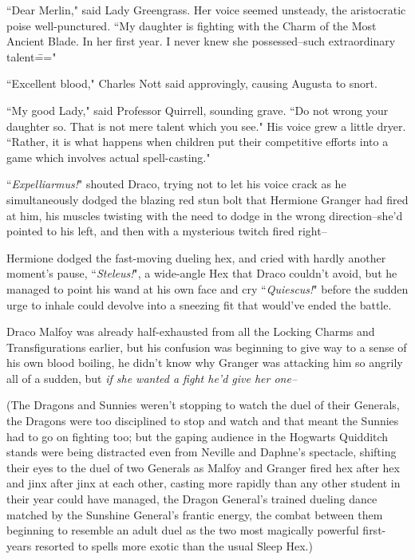 \later

``Dear Merlin," said Lady Greengrass. Her voice seemed unsteady, the aristocratic poise well-punctured. ``My daughter is fighting with the Charm of the Most Ancient Blade. In her first year. I never knew she possessed\---such extraordinary talent\==="

``Excellent blood," Charles Nott said approvingly, causing Augusta to snort.

``My good Lady," said Professor Quirrell, sounding grave. ``Do not wrong your daughter so. That is not mere talent which you see." His voice grew a little dryer. ``Rather, it is what happens when children put their competitive efforts into a game which involves actual spell-casting."

\later

``\emph{Expelliarmus!}" shouted Draco, trying not to let his voice crack as he simultaneously dodged the blazing red stun bolt that Hermione Granger had fired at him, his muscles twisting with the need to dodge in the wrong direction\---she'd pointed to his left, and then with a mysterious twitch fired right\---

Hermione dodged the fast-moving dueling hex, and cried with hardly another moment's pause, ``\emph{Steleus!}", a wide-angle Hex that Draco couldn't avoid, but he managed to point his wand at his own face and cry ``\emph{Quiescus!}" before the sudden urge to inhale could devolve into a sneezing fit that would've ended the battle.

Draco Malfoy was already half-exhausted from all the Locking Charms and Transfigurations earlier, but his confusion was beginning to give way to a sense of his own blood boiling, he didn't know why Granger was attacking him so angrily all of a sudden, but \emph{if she wanted a fight he'd give her one\---}

(The Dragons and Sunnies weren't stopping to watch the duel of their Generals, the Dragons were too disciplined to stop and watch and that meant the Sunnies had to go on fighting too; but the gaping audience in the Hogwarts Quidditch stands were being distracted even from Neville and Daphne's spectacle, shifting their eyes to the duel of two Generals as Malfoy and Granger fired hex after hex and jinx after jinx at each other, casting more rapidly than any other student in their year could have managed, the Dragon General's trained dueling dance matched by the Sunshine General's frantic energy, the combat between them beginning to resemble an adult duel as the two most magically powerful first-years resorted to spells more exotic than the usual Sleep Hex.)

